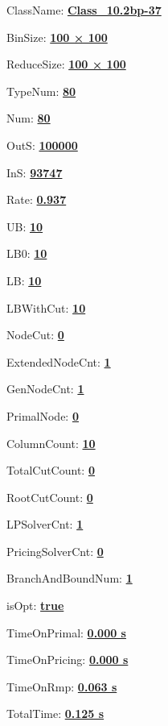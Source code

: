 \documentclass[11pt]{article}
\begin{document}
\pagestyle{empty}


ClassName: \underline{\textbf{Class_10.2bp-37}}
\par
BinSize: \underline{\textbf{100 × 100}}
\par
ReduceSize: \underline{\textbf{100 × 100}}
\par
TypeNum: \underline{\textbf{80}}
\par
Num: \underline{\textbf{80}}
\par
OutS: \underline{\textbf{100000}}
\par
InS: \underline{\textbf{93747}}
\par
Rate: \underline{\textbf{0.937}}
\par
UB: \underline{\textbf{10}}
\par
LB0: \underline{\textbf{10}}
\par
LB: \underline{\textbf{10}}
\par
LBWithCut: \underline{\textbf{10}}
\par
NodeCut: \underline{\textbf{0}}
\par
ExtendedNodeCnt: \underline{\textbf{1}}
\par
GenNodeCnt: \underline{\textbf{1}}
\par
PrimalNode: \underline{\textbf{0}}
\par
ColumnCount: \underline{\textbf{10}}
\par
TotalCutCount: \underline{\textbf{0}}
\par
RootCutCount: \underline{\textbf{0}}
\par
LPSolverCnt: \underline{\textbf{1}}
\par
PricingSolverCnt: \underline{\textbf{0}}
\par
BranchAndBoundNum: \underline{\textbf{1}}
\par
isOpt: \underline{\textbf{true}}
\par
TimeOnPrimal: \underline{\textbf{0.000 s}}
\par
TimeOnPricing: \underline{\textbf{0.000 s}}
\par
TimeOnRmp: \underline{\textbf{0.063 s}}
\par
TotalTime: \underline{\textbf{0.125 s}}
\par
\newpage


\end{document}
